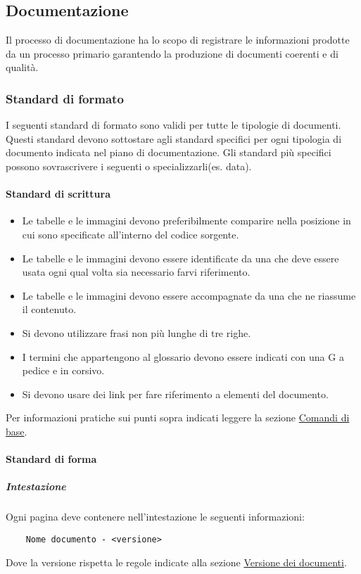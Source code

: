\subsection{Documentazione}
\label{subsec:documentazione}
Il processo di documentazione ha lo scopo di registrare le informazioni prodotte da un processo primario garantendo la produzione di documenti coerenti e di qualità.

\subsubsection{Standard di formato}
I seguenti standard di formato sono validi per tutte le tipologie di documenti.
Questi standard devono sottostare agli standard specifici per ogni tipologia di documento indicata nel piano di documentazione.
Gli standard più specifici possono sovrascrivere i seguenti o specializzarli(es. data).

\paragraph{Standard di scrittura}
\begin{itemize}
    \item Le tabelle e le immagini devono preferibilmente comparire nella posizione in cui sono specificate all'interno del codice sorgente.
    \item Le tabelle e le immagini devono essere identificate da una  che deve essere usata ogni qual volta sia necessario farvi riferimento.
    \item Le tabelle e le immagini devono essere accompagnate da una  che ne riassume il contenuto.
    \item Si devono utilizzare frasi non più lunghe di tre righe.
    \item I termini che appartengono al glossario devono essere indicati con una G a pedice e in corsivo.
    \item Si devono usare dei link per fare riferimento a elementi del documento.
\end{itemize}
Per informazioni pratiche sui punti sopra indicati leggere la sezione \hyperref[par:comandi_di_base]{Comandi di base}.

\paragraph{Standard di forma}

\subparagraph{Intestazione}
Ogni pagina deve contenere nell'intestazione le seguenti informazioni:
\begin{lstlisting}
    Nome documento - <versione>
\end{lstlisting}
Dove la versione rispetta le regole indicate alla sezione \hyperref[par:versione_documenti]{Versione dei documenti}. 

